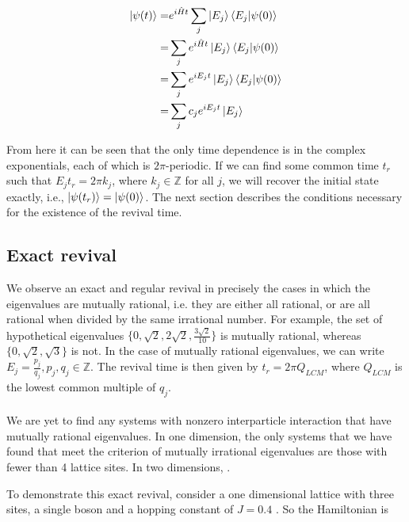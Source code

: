 \documentclass[a4paper,10pt]{article}
\begin{document}
{\begin{align}
 \ket{\psi(t)} =&       e^{i\hat{H}t}\sum_j\ket{E_j}\braket{E_j|\psi(0)}  \nonumber \\
               =&\sum_je^{i\hat{H}t}\ket{E_j}\braket{E_j|\psi(0)} \nonumber \\
                =&\sum_je^{iE_{j}t}\ket{E_j}\braket{E_j|\psi(0)}  \nonumber \\
                =&\sum_j c_{j}e^{iE_{j}t}\ket{E_j}
\end{align}

From here it can be seen that the only time dependence is in the complex exponentials, each of which is $2\pi$-periodic. If we can find some common time $t_r$ such 
that $E_{j}t_r=2\pi k_{j}$, where $k_j \in \mathbb{Z}$ for all $j$, we will recover the initial state exactly, i.e., $\ket{\psi(t_r)}=\ket{\psi(0)}$. 
The next section describes the conditions necessary for the existence of the revival time.\\

\subsection{Exact revival}

We observe an exact and regular revival in precisely the cases in which the eigenvalues are mutually rational, i.e. they are either all rational, or are all rational when 
divided by the same irrational number.
For example, the set of hypothetical eigenvalues $\{0,\sqrt{2},2\sqrt{2},\frac{3\sqrt{2}}{10}\}$ is mutually rational, whereas $\{0,\sqrt{2},\sqrt{3}\}$ is not. In the case of mutually rational eigenvalues, we can write
${E_j}=\frac{p_j}{q_j},p_j,q_j \in \mathbb{Z}$. The revival time is then given by $t_r=2\pi Q_{LCM}$, where $Q_{LCM}$ is the lowest common multiple of ${q_j}$. 
\\\\
We are yet to find any systems with nonzero interparticle interaction that have mutually rational eigenvalues.
In one dimension, the only systems that we have found that meet the criterion of mutually irrational eigenvalues are those with fewer than 4 lattice sites. In two
dimensions, .

To demonstrate this exact revival, consider a one dimensional lattice with three sites, a single boson and a hopping constant of $J=0.4$ . So the Hamiltonian is

}
\end{document}
